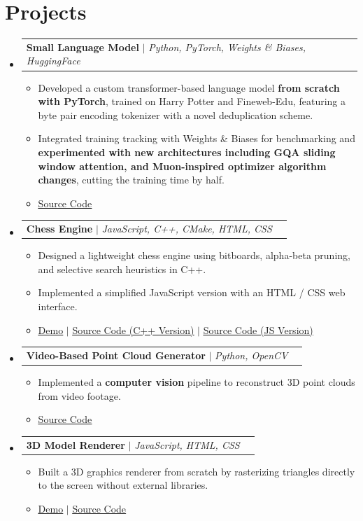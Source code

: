 \documentclass[letterpaper,11pt]{article}
\makeatletter
\newcommand{\resumeItem}[1]{
  \item\small{
    {#1 \vspace{-2pt}}
  }
}
\newcommand{\resumeProjectHeading}[2]{
    \item
    \begin{tabular*}{0.97\textwidth}{l@{\extracolsep{\fill}}r}
      \small#1 & #2 \\
    \end{tabular*}\vspace{-7pt}
}
\newcommand{\resumeSubHeadingListStart}{\begin{itemize}[leftmargin=0.15in, label={}]}
\newcommand{\resumeSubHeadingListEnd}{\end{itemize}}
\newcommand{\resumeItemListStart}{\begin{itemize}}
\newcommand{\resumeItemListEnd}{\end{itemize}\vspace{-5pt}}
\makeatother
\begin{document}
\section{Projects}
  \resumeSubHeadingListStart
    \resumeProjectHeading
      {\textbf{Small Language Model} $|$ \emph{Python, PyTorch, Weights \& Biases, HuggingFace}}{}
      \resumeItemListStart
        \resumeItem{Developed a custom transformer-based language model \textbf{from scratch with PyTorch}, trained on Harry Potter and Fineweb-Edu, featuring a byte pair encoding tokenizer with a novel deduplication scheme.}
        \resumeItem{Integrated training tracking with Weights \& Biases for benchmarking and \textbf{experimented with new architectures including GQA sliding window attention, and Muon-inspired optimizer algorithm changes}, cutting the training time by half.}
        \resumeItem{\href{https://github.com/kawgit/Athena}{\underline{Source Code}}}
      \resumeItemListEnd
    
    \resumeProjectHeading
      {\textbf{Chess Engine} $|$ \emph{JavaScript, C++, CMake, HTML, CSS}}{}
      \resumeItemListStart
        \resumeItem{Designed a lightweight chess engine using bitboards, alpha-beta pruning, and selective search heuristics in C++.}
        \resumeItem{Implemented a simplified JavaScript version with an HTML / CSS web interface.}
        \resumeItem{\href{https://kawgit.github.io/Vision-JS/index.html}{\underline{Demo}} $|$ \href{https://github.com/kawgit/Vision-Chess}{\underline{Source Code (C++ Version)}} $|$ \href{https://github.com/kawgit/Vision-Chess-JS}{\underline{Source Code (JS Version)}}}
      \resumeItemListEnd

    \resumeProjectHeading
      {\textbf{Video-Based Point Cloud Generator} $|$ \emph{Python, OpenCV}}{}
      \resumeItemListStart
        \resumeItem{Implemented a \textbf{computer vision} pipeline to reconstruct 3D point clouds from video footage.}
        \resumeItem{\href{https://github.com/kawgit/slam}{\underline{Source Code}}}
      \resumeItemListEnd

    \resumeProjectHeading
      {\textbf{3D Model Renderer} $|$ \emph{JavaScript, HTML, CSS}}{}
      \resumeItemListStart
        \resumeItem{Built a 3D graphics renderer from scratch by rasterizing triangles directly to the screen without external libraries.}
        \resumeItem{\href{https://kawgit.github.io/3D-Model-Renderer/index.html}{\underline{Demo}} $|$ \href{https://github.com/kawgit/3D-Model-Renderer}{\underline{Source Code}}}
      \resumeItemListEnd
  \resumeSubHeadingListEnd
\end{document}
